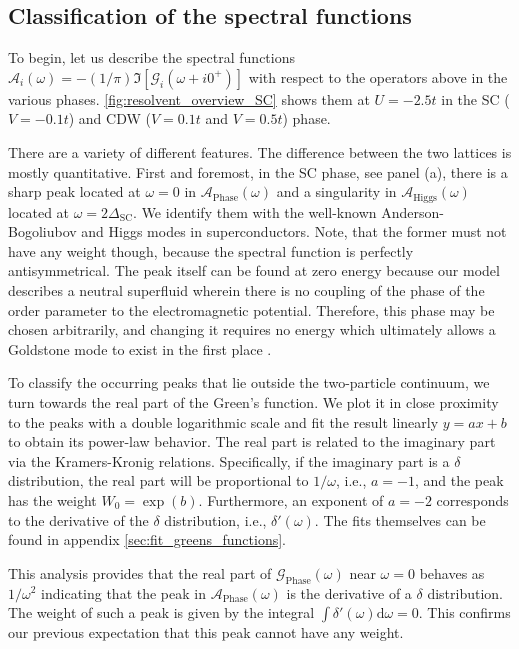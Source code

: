 \documentclass[
    reprint, 
    aps,
    preprintnumbers,
    twocolumn,
    prb,
    superscriptaddress
]{revtex4-2}
\newcommand{\greens}[1]{\mathcal{G}_\text{#1} (\omega)}
\newcommand{\spectral}[1]{\mathcal{A}_\text{#1}  (\omega)}
\begin{document}
\subsection{Classification of the spectral functions}

To begin, let us describe the spectral functions $\mathcal{A}_i (\omega) = - (1/\pi) \Im [\mathcal{G}_i (\omega + i0^+)]$ with respect to the operators above in the various phases.
\autoref{fig:resolvent_overview_SC} shows them at $U = -2.5t$ in the SC ($V=-0.1t$) and CDW ($V=0.1t$ and $V=0.5t$) phase.

There are a variety of different features. The difference between the two lattices is mostly quantitative.
First and foremost, in the SC phase, see panel (a), 
there is a sharp peak located at $\omega=0$ in $\spectral{Phase}$ and a singularity in $\spectral{Higgs}$ located at $\omega=2\Delta_\text{SC}$.
We identify them with the well-known Anderson-Bogoliubov and Higgs modes in superconductors.
Note, that the former must not have any weight though, because the spectral function is perfectly antisymmetrical.
The peak itself can be found at zero energy because our model describes a neutral superfluid 
wherein there is no coupling of the phase of the order parameter to the electromagnetic potential.
Therefore, this phase may be chosen arbitrarily, and changing it requires no energy 
which ultimately allows a Goldstone mode to exist in the first place \cite{Goldstone1961,Anderson63}.

To classify the occurring peaks that lie outside the two-particle continuum, we turn towards the real part of the Green's function.
We plot it in close proximity to the peaks with a double logarithmic scale and fit the result linearly $y = ax + b$ to obtain its power-law behavior.
The real part is related to the imaginary part via the Kramers-Kronig relations.
Specifically, if the imaginary part is a $\delta$ distribution, the real part will be proportional to $1/\omega$, i.e., $a=-1$, and the peak has the weight $W_0 = \exp(b)$.
Furthermore, an exponent of $a=-2$ corresponds to the derivative of the $\delta$ distribution, i.e., $\delta'(\omega)$.
The fits themselves can be found in appendix \ref{sec:fit_greens_functions}.

This analysis provides that the real part of $\greens{Phase}$ near $\omega=0$ behaves as $1/\omega^2$ indicating that the peak in $\spectral{Phase}$ is the derivative of a $\delta$ distribution.
The weight of such a peak is given by the integral $\int \delta'(\omega) \mathrm{d}\omega = 0$.
This confirms our previous expectation that this peak cannot have any weight.
\end{document}

